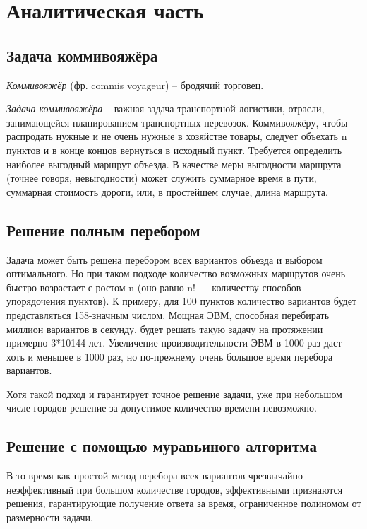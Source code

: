 \chapter{Аналитическая часть}


\section{Задача коммивояжёра}

\textit{Коммивояжёр} (фр. commis voyageur) -- бродячий торговец.

\textit{Задача коммивояжёра} -- важная задача транспортной логистики,
отрасли, занимающейся планированием транспортных перевозок.
Коммивояжёру, чтобы распродать нужные и не очень нужные в хозяйстве товары,
следует объехать n пунктов и в конце концов вернуться в исходный пункт.
Требуется определить наиболее выгодный маршрут объезда.
В качестве меры выгодности маршрута (точнее говоря, невыгодности)
может служить суммарное время в пути, суммарная стоимость дороги, или,
в простейшем случае, длина маршрута.



\section{Решение полным перебором}

Задача может быть решена перебором всех вариантов объезда и выбором оптимального.
Но при таком подходе количество возможных маршрутов очень
быстро возрастает с ростом n (оно равно n! — количеству способов упорядочения пунктов).
К примеру, для 100 пунктов количество вариантов будет представляться 158-значным числом.
Мощная ЭВМ, способная перебирать миллион вариантов в секунду,
будет решать такую задачу на протяжении примерно 3*10144 лет.
Увеличение производительности ЭВМ в 1000 раз даст хоть и меньшее в 1000 раз,
но по-прежнему очень большое время перебора вариантов.

Хотя такой подход и гарантирует точное решение задачи,
уже при небольшом числе городов решение за допустимое количество времени невозможно.


\section{Решение с помощью муравьиного алгоритма}

В то время как простой метод перебора всех вариантов чрезвычайно
неэффективный при большом количестве городов,
эффективными признаются решения, гарантирующие получение
ответа за время, ограниченное полиномом от размерности задачи.

